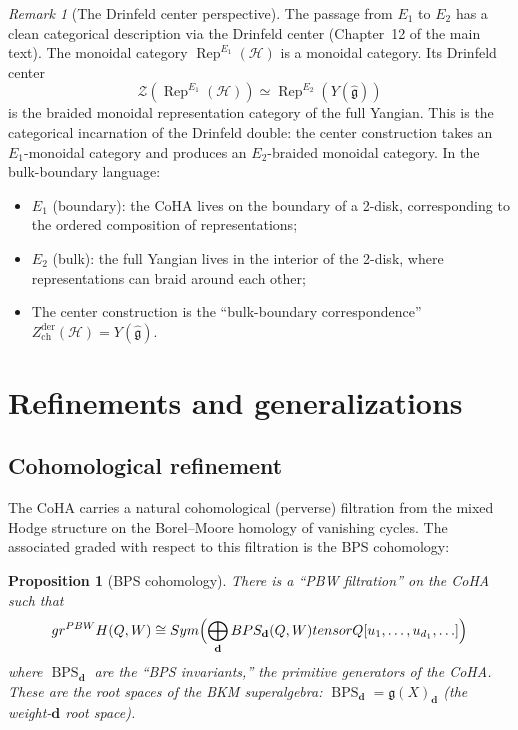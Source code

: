 \documentclass[11pt]{article}
\newtheorem{proposition}[theorem]{Proposition}
\theoremstyle{definition}
\theoremstyle{remark}
\newtheorem{remark}[theorem]{Remark}
\newcommand{\QQ}{\mathbb{Q}}
\newcommand{\Rep}{\operatorname{Rep}}
\newcommand{\Sym}{\operatorname{Sym}}
\newcommand{\CoHA}{\mathcal{H}}
\newcommand{\cZ}{\mathcal{Z}}
\newcommand{\frakg}{\mathfrak{g}}
\begin{document}
\begin{remark}[The Drinfeld center perspective]
\label{rem:drinfeld-center}
The passage from $E_1$ to $E_2$ has a clean categorical description via the
Drinfeld center (Chapter~12 of the main text). The monoidal category
$\Rep^{E_1}(\CoHA)$ is a monoidal category. Its Drinfeld center
\[
 \cZ(\Rep^{E_1}(\CoHA)) \simeq \Rep^{E_2}(Y(\widehat{\frakg}))
\]
is the braided monoidal representation category of the full Yangian. This is
the categorical incarnation of the Drinfeld double: the center construction
takes an $E_1$-monoidal category and produces an $E_2$-braided monoidal category.
In the bulk-boundary language:
\begin{itemize}
 \item $E_1$ (boundary): the CoHA lives on the boundary of a 2-disk,
 corresponding to the ordered composition of representations;
 \item $E_2$ (bulk): the full Yangian lives in the interior of the 2-disk,
 where representations can braid around each other;
 \item The center construction is the ``bulk-boundary correspondence''
 $Z^{\mathrm{der}}_{\mathrm{ch}}(\CoHA) = Y(\widehat{\frakg})$.
\end{itemize}
\end{remark}


\section{Refinements and generalizations}
\label{sec:refinements}

\subsection{Cohomological refinement}
\label{subsec:coh-refinement}

The CoHA carries a natural cohomological (perverse) filtration from the
mixed Hodge structure on the Borel--Moore homology of vanishing cycles.
The associated graded with respect to this filtration is the BPS cohomology:

\begin{proposition}[BPS cohomology]
\label{prop:bps}
There is a ``PBW filtration'' on the CoHA such that
\[
 \operatorname{gr}^{\mathrm{PBW}} \CoHA(Q,W)
 \cong \Sym\Bigl(\bigoplus_{\mathbf{d}} \operatorname{BPS}_{\mathbf{d}}(Q,W) \otimes
 \QQ[u_1, \ldots, u_{d_1}, \ldots]\Bigr)
\]
where $\operatorname{BPS}_{\mathbf{d}}$ are the ``BPS invariants,'' the primitive
generators of the CoHA. These are the root spaces of the BKM superalgebra:
$\operatorname{BPS}_{\mathbf{d}} = \frakg(X)_{\mathbf{d}}$ (the weight-$\mathbf{d}$
root space).
\end{proposition}
\end{document}
